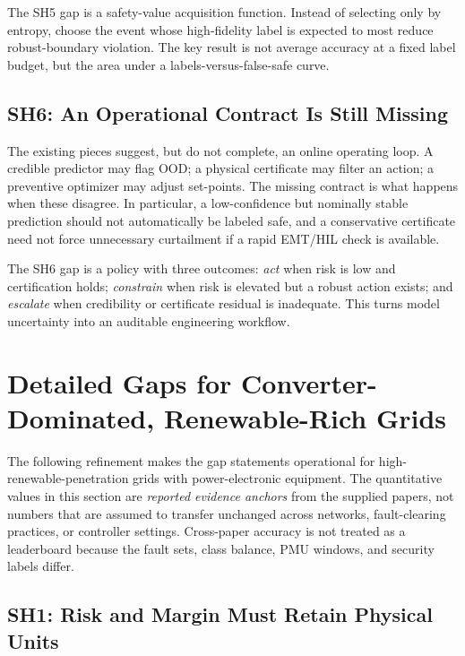 \documentclass[conference]{IEEEtran}
\begin{document}
The SH5 gap is a safety-value acquisition function. Instead of selecting only by entropy, choose the event whose high-fidelity label is expected to most reduce robust-boundary violation. The key result is not average accuracy at a fixed label budget, but the area under a labels-versus-false-safe curve.

\subsection{SH6: An Operational Contract Is Still Missing}

The existing pieces suggest, but do not complete, an online operating loop. A credible predictor may flag OOD; a physical certificate may filter an action; a preventive optimizer may adjust set-points. The missing contract is what happens when these disagree. In particular, a low-confidence but nominally stable prediction should not automatically be labeled safe, and a conservative certificate need not force unnecessary curtailment if a rapid EMT/HIL check is available.

The SH6 gap is a policy with three outcomes: \emph{act} when risk is low and certification holds; \emph{constrain} when risk is elevated but a robust action exists; and \emph{escalate} when credibility or certificate residual is inadequate. This turns model uncertainty into an auditable engineering workflow.

\section{Detailed Gaps for Converter-Dominated, Renewable-Rich Grids}

The following refinement makes the gap statements operational for high-renewable-penetration grids with power-electronic equipment. The quantitative values in this section are \emph{reported evidence anchors} from the supplied papers, not numbers that are assumed to transfer unchanged across networks, fault-clearing practices, or controller settings. Cross-paper accuracy is not treated as a leaderboard because the fault sets, class balance, PMU windows, and security labels differ.

\subsection{SH1: Risk and Margin Must Retain Physical Units}
\end{document}
